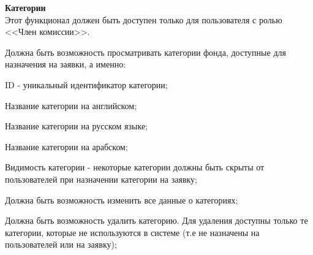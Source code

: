 \begin{subreg}
    \item \textbf{Категории\\}
    Этот функционал должен быть доступен только для пользователя с ролью <<Член комиссии>>.
    \begin{subreg}
        \item Должна быть возможность просматривать категории фонда, доступные для назначения на заявки, а именно:
        \begin{subreg}
            \item ID - уникальный идентификатор категории;
            \item Название категории на английском;
            \item Название категории на русском языке;
            \item Название категории на арабском;
            \item Видимость категории - некоторые категории должны быть скрыты от пользователей при назначении категории на заявку;
        \end{subreg}
        \item Должна быть возможность изменить все данные о категориях;
        \item Должна быть возможность удалить категорию. Для удаления доступны только те категории, которые не используются в системе (т.е не назначены на пользователей или на заявку);
    \end{subreg}
    

\end{subreg}
